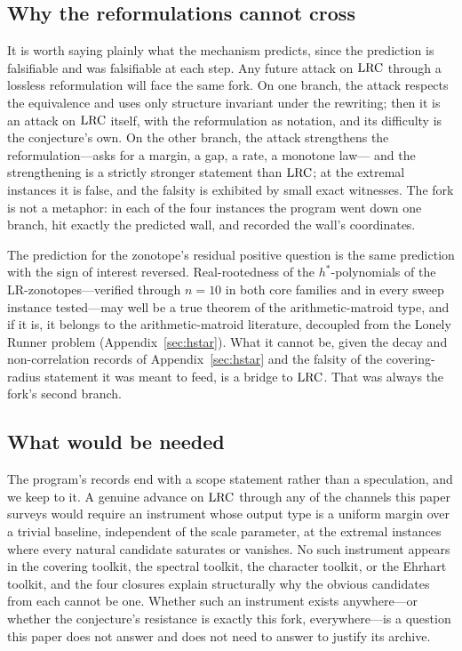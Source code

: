 \subsection{Why the reformulations cannot cross}

It is worth saying plainly what the mechanism predicts, since the
prediction is falsifiable and was falsifiable at each step. Any future
attack on $\mathrm{LRC}$ through a lossless reformulation will face the same
fork. On one branch, the attack respects the equivalence and uses only
structure invariant under the rewriting; then it is an attack on
$\mathrm{LRC}$ itself, with the reformulation as notation, and its difficulty
is the conjecture's own. On the other branch, the attack strengthens
the reformulation---asks for a margin, a gap, a rate, a monotone law---
and the strengthening is a strictly stronger statement than $\mathrm{LRC}$;
at the extremal instances it is false, and the falsity is exhibited by
small exact witnesses. The fork is not a metaphor: in each of the four
instances the program went down one branch, hit exactly the predicted
wall, and recorded the wall's coordinates.

The prediction for the zonotope's residual positive question is the same
prediction with the sign of interest reversed. Real-rootedness of the
$h^*$-polynomials of the LR-zonotopes---verified through $n=10$ in both
core families and in every sweep instance tested---may well be a true
theorem of the arithmetic-matroid type, and if it is, it belongs to the
arithmetic-matroid literature, decoupled from the Lonely Runner problem
(Appendix~\ref{sec:hstar}). What it cannot be, given the decay and
non-correlation records of Appendix~\ref{sec:hstar} and the falsity of
the covering-radius statement it was meant to feed, is a bridge to
$\mathrm{LRC}$. That was always the fork's second branch.

\subsection{What would be needed}

The program's records end with a scope statement rather than a
speculation, and we keep to it. A genuine advance on $\mathrm{LRC}$ through any
of the channels this paper surveys would require an instrument whose
output type is a uniform margin over a trivial baseline, independent of
the scale parameter, at the extremal instances where every natural
candidate saturates or vanishes. No such instrument appears in the
covering toolkit, the spectral toolkit, the character toolkit, or the
Ehrhart toolkit, and the four closures explain structurally why the
obvious candidates from each cannot be one. Whether such an instrument
exists anywhere---or whether the conjecture's resistance is exactly this
fork, everywhere---is a question this paper does not answer and does
not need to answer to justify its archive.

